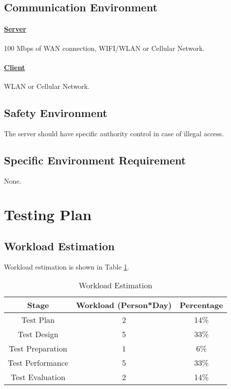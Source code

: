 \documentclass[10pt]{article}
\begin{document}
	\subsection{Communication Environment}
	\paragraph{\underline{Server}} 100 Mbps of WAN connection, WIFI/WLAN or Cellular Network.
	\paragraph{\underline{Client}} WLAN or Cellular Network.

	\subsection{Safety Environment}
	The server should have specific authority control in case of illegal access.

	\subsection{Specific Environment Requirement}
	None.

	\section{Testing Plan}
	\subsection{Workload Estimation}
	Workload estimation is shown in Table \ref{Workload Estimation}.
	
	\begin{table}[htb]
		\centering
		\begin{tabular}{|c|c|c|}
		\hline
		Stage            & Workload (Person*Day) & Percentage \\ \hline
		Test Plan        & 2                     & 14\%       \\ \hline
		Test Design      & 5                     & 33\%       \\ \hline
		Test Preparation & 1                     & 6\%        \\ \hline
		Test Performance & 5                     & 33\%       \\ \hline
		Test Evaluation  & 2                     & 14\%       \\ \hline
		\end{tabular}

		\caption{Workload Estimation}
		\label{Workload Estimation}
		\end{table}
\end{document}
